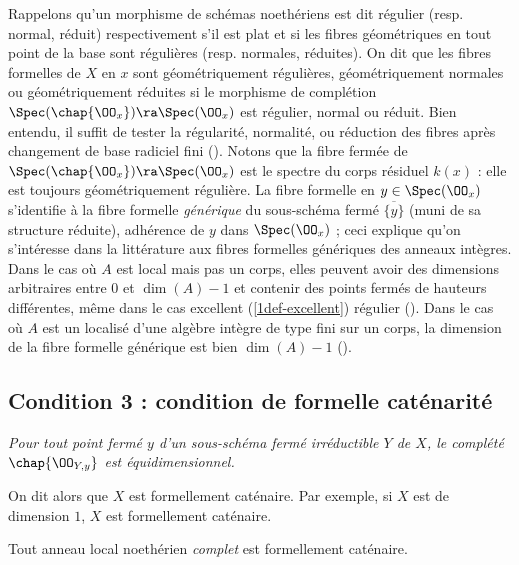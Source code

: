 \documentclass[10pt]{../fichiers-configuration-latex/smfart}
\begin{document}
\begin{remarque}\label{1rem-fibre} Rappelons qu'un morphisme de schémas noethériens est dit régulier
(resp. normal, réduit) respectivement s'il est plat et si les fibres géométriques en tout point de
la base sont régulières (resp. normales, réduites). On dit que les fibres formelles de $X$ en $x$
sont géométriquement régulières, géométriquement normales ou géométriquement réduites si le
morphisme de complétion $\Spec(\chap{\OO_x})\ra\Spec(\OO_x)$ est régulier, normal ou réduit. Bien
entendu, il suffit de tester la régularité, normalité, ou réduction des fibres après changement de
base radiciel fini ().  Notons que la fibre fermée de
$\Spec(\chap{\OO_x})\ra\Spec(\OO_x)$ est le spectre du corps résiduel $k(x)$ : elle est toujours
géométriquement régulière. La fibre formelle en $y\in\Spec(\OO_x)$ s'identifie à la fibre formelle
\emph{générique} du sous-schéma fermé $\overline{\{y\}}$ (muni de sa structure réduite), adhérence
de $y$ dans $\Spec(\OO_{x})$ ; ceci explique qu'on s'intéresse dans la littérature aux fibres
formelles génériques des anneaux intègres. Dans le cas où $A$ est local mais pas un corps, elles
peuvent avoir des dimensions arbitraires entre $0$ et $\dim(A)-1$ et contenir des points fermés de
hauteurs différentes, même dans le cas excellent (\ref{1def-excellent}) régulier (\cite{Rot91}).
Dans le cas où $A$ est un localisé d'une algèbre intègre de type fini sur un corps, la dimension de
la fibre formelle générique est bien $\dim(A)-1$ (\cite{Mat88}).  \end{remarque}




\subsection{Condition 3 : condition de formelle caténarité} \emph{Pour tout point fermé $y$ d'un
sous-schéma fermé irréductible $Y$ de $X$, le complété\footnotemark $\chap{\OO_{Y,y}}$ est
équidimensionnel.  }

On dit alors que $X$ est formellement caténaire. Par exemple, si $X$ est de dimension $1$,  $X$ est
formellement caténaire.

\begin{exemple}\label{1reg-form-cat}\label{1complet-formel-cat} Tout anneau local noethérien
\emph{complet} est formellement caténaire.\end{exemple}
\end{document}
